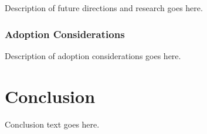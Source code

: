\documentclass[12pt]{article}
\begin{document}
Description of future directions and research goes here.

\subsubsection{Adoption Considerations}

Description of adoption considerations goes here.

\section{Conclusion}

Conclusion text goes here.

\clearpage
\printbibliography[heading=bibintoc, title={References}]
\clearpage
\appendix

\end{document}
